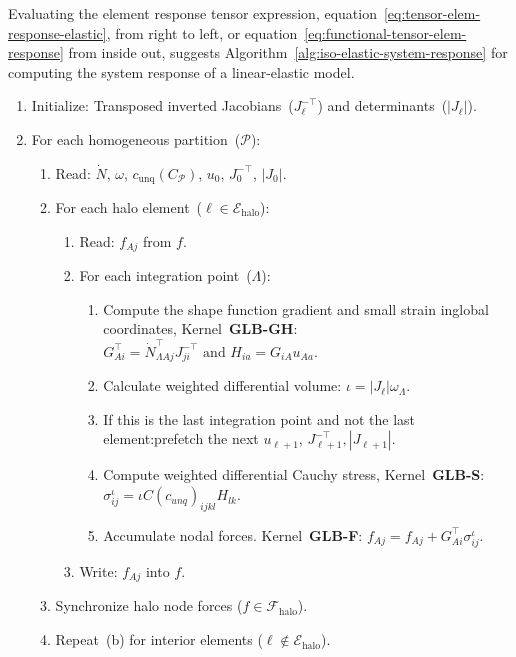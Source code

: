 \documentclass[]             %
{NASA}                       %
\begin{document}
Evaluating the element response tensor expression, equation~\ref{eq:tensor-elem-response-elastic}, from right to left, or equation~\ref{eq:functional-tensor-elem-response} from inside out, suggests Algorithm~\ref{alg:iso-elastic-system-response} for computing the system response of a linear-elastic model.
\begin{algorithm}[ht]%
\caption{Global coordinates elastic response tensor kernels}
\label{alg:iso-elastic-system-response}
\begin{enumerate}
\item Initialize:
Transposed inverted Jacobians~(${J}_{\ell}^{-\top}$) and determinants~($|{J}_{\ell}|$).
\item For each homogeneous partition~($\mathcal{P}$):
\begin{enumerate}
\item Read: $\dot{N}$, $\omega$, $c_{\mathrm{unq}}(C_{\mathcal{P}})$,
${u}_{0}$, ${{J}}_{0}^{-\top}$, $|{J}_{0}|$.
\item For each halo element~($\ell \in \mathcal{E}_{\mathrm{halo}}$):
\begin{enumerate}
\item Read: $f_{Aj}$ from ${f}$.
\item For each integration point~($\Lambda$):
\begin{enumerate}
\item Compute the shape function gradient and small strain in\break global coordinates,
\newline
Kernel~\textbf{GLB\nobreakdash-GH}: $G_{Ai}^{\top} = \dot{N}_{\Lambda Aj}^{\top} {J}_{ji}^{-\top}\text{ and }H_{ia} = G_{iA} u_{Aa}$.
\item Calculate weighted differential volume: $\iota = |{J}_{\ell}| \omega_{\Lambda}$.
\item If this is the last integration point and not the last element:\break prefetch the next ${u}_{\ell+1}$, ${J}_{\ell+1}^{-\top}, |{J}_{\ell+1}|$.
\item Compute weighted differential Cauchy stress,
\newline
Kernel~\textbf{GLB\nobreakdash-S}: $\sigma_{ij}^{\iota} = \iota C(c_{unq})_{ijkl} H_{lk}$.
\item Accumulate nodal forces.
\newline
Kernel~\textbf{GLB\nobreakdash-F}: $f_{Aj} = f_{Aj} + G_{Ai}^{\top}\sigma_{ij}^{\iota}$.
\end{enumerate}
\item Write: $f_{Aj}$ into ${f}$.
\end{enumerate}
\item Synchronize halo node forces ($f \in \mathcal{F}_{\mathrm{halo}}$).
\item Repeat~(b) for interior elements ($\ell \notin \mathcal{E}_{\mathrm{halo}}$).
\end{enumerate}
\end{enumerate}
\end{algorithm}
\end{document}
